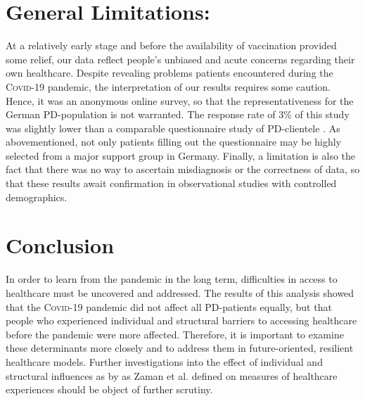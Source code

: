 \documentclass[a4paper,oneside,11pt,english]{scrartcl}
\begin{document}
\section*{General Limitations:}
At a relatively early stage and before the availability of vaccination provided some relief, our data reflect people's unbiased and acute concerns regarding their own healthcare. Despite revealing problems patients encountered during the \textsc{Covid}-19 pandemic, the interpretation of our results requires some caution. Hence, it was an anonymous online survey, so that the representativeness for the German \textsc{PD}-population is not warranted. The response rate of 3\% of this study was slightly lower than a comparable questionnaire study of \textsc{PD}-clientele \cite{frundt2022impact}. As abovementioned, not only patients filling out the questionnaire may be highly selected from a major support group in Germany. Finally, a limitation is also the fact that there was no way to ascertain misdiagnosis or the correctness of data, so that these results await confirmation in observational studies with controlled demographics.

\section*{Conclusion}
In order to learn from the pandemic in the long term, difficulties in access to healthcare must be uncovered and addressed. The results of this analysis showed that the \textsc{Covid}-19 pandemic did not affect all \textsc{\textsc{PD}}-patients equally, but that people who experienced individual and structural barriers to accessing healthcare before the pandemic were more affected. Therefore, it is important to examine these determinants more closely and to address them in future-oriented, resilient healthcare models. Further investigations into the effect of individual and structural influences as by as Zaman et al. defined on measures of healthcare experiences should be object of further scrutiny. 
\newpage

% 
\printbibliography %

\newpage
\end{document}
